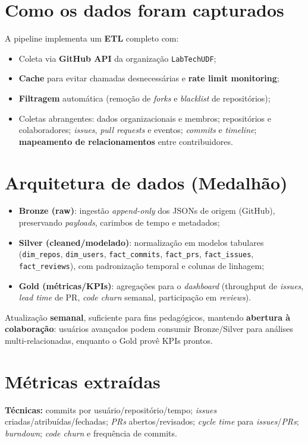 \documentclass[
	12pt,
	openright,
	oneside,
	a4paper,
	brazil
]{abntex2}
\begin{document}
\begin{apendicesenv}
\section*{Como os dados foram capturados}
A pipeline implementa um \textbf{ETL} completo com:
\begin{itemize}
    \item Coleta via \textbf{GitHub API} da organização \texttt{LabTechUDF};
    \item \textbf{Cache} para evitar chamadas desnecessárias e \textbf{rate limit monitoring};
    \item \textbf{Filtragem} automática (remoção de \textit{forks} e \textit{blacklist} de repositórios);
    \item Coletas abrangentes: dados organizacionais e membros; repositórios e colaboradores; \textit{issues}, \textit{pull requests} e eventos; \textit{commits} e \textit{timeline}; \textbf{mapeamento de relacionamentos} entre contribuidores.
\end{itemize}

\section*{Arquitetura de dados (Medalhão)}
\begin{itemize}
    \item \textbf{Bronze (raw)}: ingestão \emph{append-only} dos JSONs de origem (GitHub), preservando \textit{payloads}, carimbos de tempo e metadados;
    \item \textbf{Silver (cleaned/modelado)}: normalização em modelos tabulares (\texttt{dim\_repos}, \texttt{dim\_users}, \texttt{fact\_commits}, \texttt{fact\_prs}, \texttt{fact\_issues}, \texttt{fact\_reviews}), com padronização temporal e colunas de linhagem;
    \item \textbf{Gold (métricas/KPIs)}: agregações para o \textit{dashboard} (throughput de \textit{issues}, \textit{lead time} de PR, \textit{code churn} semanal, participação em \textit{reviews}).
\end{itemize}
\noindent Atualização \textbf{semanal}, suficiente para fins pedagógicos, mantendo \textbf{abertura à colaboração}: usuários avançados podem consumir Bronze/Silver para análises multi-relacionadas, enquanto o Gold provê KPIs prontos.

\section*{Métricas extraídas}
\textbf{Técnicas:} commits por usuário/repositório/tempo; \textit{issues} criadas/atribuídas/fechadas; \textit{PRs} abertos/revisados; \textit{cycle time} para \textit{issues}/\textit{PRs}; \textit{burndown}; \textit{code churn} e frequência de commits.


\end{apendicesenv}
\end{document}
